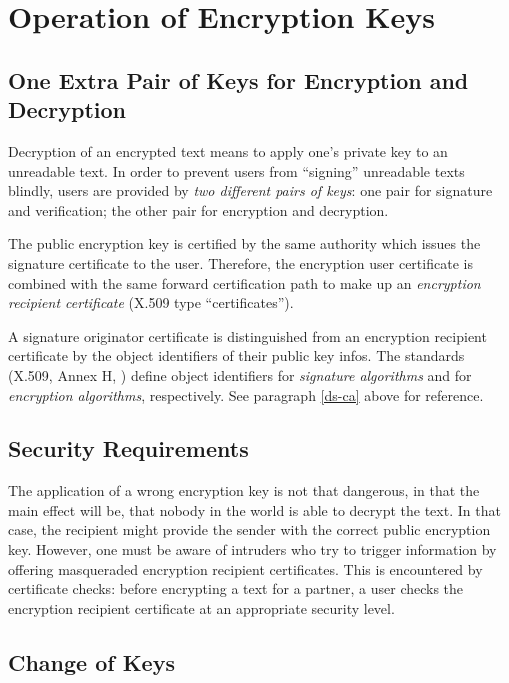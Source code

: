 \section{Operation of Encryption Keys}
\thispagestyle{myheadings}
\label{ope}

\subsection{One Extra Pair of Keys for Encryption and Decryption}
\label{ope-epk}

Decryption of an encrypted text means to apply one's private key
to an unreadable text. In order to prevent users from ``signing''
unreadable texts blindly,
users are provided by {\em two different pairs of keys}:
one pair for signature and verification; the other pair for
encryption and decryption.

The public encryption key is certified by the same authority which
issues the signature certificate to the user. Therefore,
the encryption user certificate is combined with the same
forward certification path to make up an
{\em encryption recipient certificate}
(X.509 type ``certificates'').

A signature originator certificate is distinguished from
an encryption recipient certificate by the object identifiers
of their public key infos.
The standards (X.509, Annex H, \cite{cci4}) define
object identifiers for {\em signature algorithms}
and for {\em encryption algorithms}, respectively.
See paragraph \ref{ds-ca} above for reference.

\subsection{Security Requirements}
\label{ope-sr}

The application of a wrong encryption key is not that dangerous,
in that the main effect will be, that nobody in the world is able
to decrypt the text. In that case, the recipient might provide
the sender with the correct public encryption key.
However, one must be aware of intruders
who try to trigger information by offering masqueraded
encryption recipient certificates.
This is encountered by certificate checks:
before encrypting a text for a partner,
a user checks the encryption recipient certificate at an
appropriate security level.

\subsection{Change of Keys}
\label{ope-ck}


